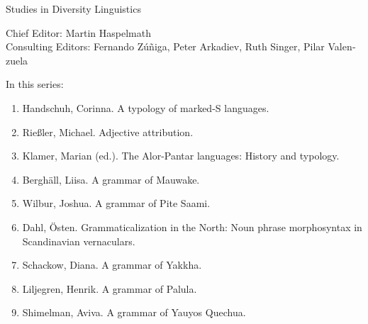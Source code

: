 {\large Studies in Diversity Linguistics}

\bigskip

Chief Editor: Martin Haspelmath \\
Consulting Editors: Fernando Zúñiga, Peter Arkadiev, Ruth Singer, Pilar Valen­zuela

\bigskip

In this series:

\begin{enumerate}
\item Handschuh, Corinna. A typology of marked-S languages.
\item Rießler, Michael. Adjective attribution.
\item Klamer, Marian (ed.). The Alor-Pantar languages: History and typology.
\item Berghäll, Liisa. A grammar of Mauwake.
\item Wilbur, Joshua. A grammar of Pite Saami.
\item Dahl, Östen. Grammaticalization in the North: Noun phrase morphosyntax in Scandinavian vernaculars.
\item Schackow, Diana.    A grammar of Yakkha.
\item Liljegren, Henrik. A grammar of Palula.
\item Shimelman, Aviva. A grammar of Yauyos Quechua. 
\end{enumerate}